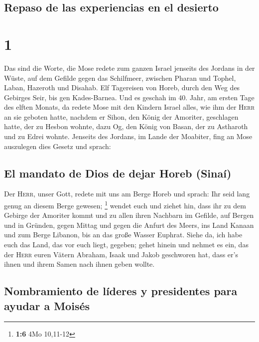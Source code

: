 \hypertarget{repaso-de-las-experiencias-en-el-desierto}{%
\subsection{Repaso de las experiencias en el
desierto}\label{repaso-de-las-experiencias-en-el-desierto}}

\hypertarget{section}{%
\section{1}\label{section}}

 Das sind die Worte, die Mose redete zum ganzen Israel
jenseits des Jordans in der Wüste, auf dem Gefilde gegen das Schilfmeer,
zwischen Pharan und Tophel, Laban, Hazeroth und Disahab. 
Elf Tagereisen von Horeb, durch den Weg des Gebirges Seir, bis gen
Kades-Barnea.  Und es geschah im 40. Jahr, am ersten Tage
des elften Monats, da redete Mose mit den Kindern Israel alles, wie ihm
der \textsc{Herr} an sie geboten hatte,  nachdem er Sihon,
den König der Amoriter, geschlagen hatte, der zu Hesbon wohnte, dazu Og,
den König von Basan, der zu Astharoth und zu Edrei wohnte.
 Jenseits des Jordans, im Lande der Moabiter, fing an Mose
auszulegen dies Gesetz und sprach:

\hypertarget{el-mandato-de-dios-de-dejar-horeb-sinauxed}{%
\subsection{El mandato de Dios de dejar Horeb
(Sinaí)}\label{el-mandato-de-dios-de-dejar-horeb-sinauxed}}

 Der \textsc{Herr}, unser Gott, redete mit uns am Berge
Horeb und sprach: Ihr seid lang genug an diesem Berge gewesen;
\footnote{\textbf{1:6} 4Mo 10,11-12}  wendet euch und
ziehet hin, dass ihr zu dem Gebirge der Amoriter kommt und zu allen
ihren Nachbarn im Gefilde, auf Bergen und in Gründen, gegen Mittag und
gegen die Anfurt des Meers, ins Land Kanaan und zum Berge Libanon, bis
an das große Wasser Euphrat.  Siehe da, ich habe euch das
Land, das vor euch liegt, gegeben; gehet hinein und nehmet es ein, das
der \textsc{Herr} euren Vätern Abraham, Isaak und Jakob geschworen hat,
dass er's ihnen und ihrem Samen nach ihnen geben wollte.

\hypertarget{nombramiento-de-luxedderes-y-presidentes-para-ayudar-a-moisuxe9s}{%
\subsection{Nombramiento de líderes y presidentes para ayudar a
Moisés}\label{nombramiento-de-luxedderes-y-presidentes-para-ayudar-a-moisuxe9s}}

